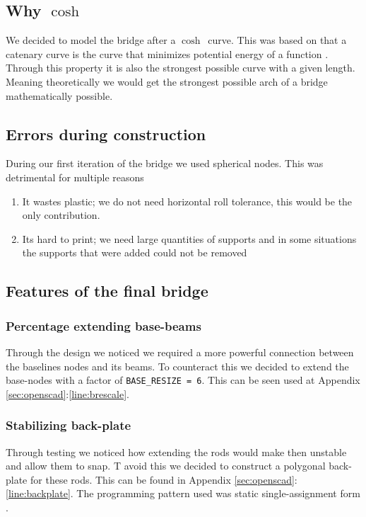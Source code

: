 \documentclass{report}
\begin{document}
\subsection {Why $\cosh$}

We decided to model the bridge after a $\cosh$ curve. This was based on that a catenary curve is the curve that minimizes potential energy of a function \cite{wiki:catenery}. Through this property it is also the strongest possible curve with a given length. Meaning theoretically we would get the strongest possible arch of a bridge mathematically possible.

\subsection {Errors during construction}

During our first iteration of the bridge we used spherical nodes. This was detrimental for multiple reasons

\begin{enumerate}
	\item It wastes plastic; we do not need horizontal roll tolerance, this would be the only contribution.
	\item Its hard to print; we need large quantities of supports and in some situations the supports that were added could not be removed
\end{enumerate}

\subsection {Features of the final bridge}

\subsubsection {Percentage extending base-beams}

Through the design we noticed we required a more powerful connection between the baselines nodes and its beams. To counteract this we decided to extend the base-nodes with a factor of \lstinline{BASE_RESIZE = 6}. This can be seen used at Appendix \ref{sec:openscad}:\ref{line:brescale}.

\subsubsection {Stabilizing back-plate}

Through testing we noticed how extending the rods would make then unstable and allow them to snap. T avoid this we decided to construct a polygonal back-plate for these rods. This can be found in Appendix \ref{sec:openscad}:\ref{line:backplate}. The programming pattern used was static single-assignment form \cite{wiki:ssaf}.
\end{document}
